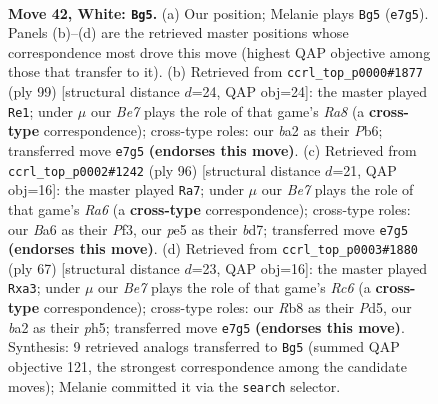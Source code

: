 \documentclass[11pt]{article}
\begin{document}
\clearpage

\begin{figure}[p]\centering
\begin{subfigure}{0.46\textwidth}\centering
\resizebox{\linewidth}{!}{%
\newchessgame
\chessboard[
  setfen={1R6/4B1k1/B7/4p3/4r2p/5p1P/b4P1K/8 w - - 12 42},
  showmover=false,
  pgfstyle=straightmove, color=movearrow, markmove={e7-g5}
]}
\caption{}
\end{subfigure}\hfill
\begin{subfigure}{0.46\textwidth}\centering
\resizebox{\linewidth}{!}{%
\newchessgame
\chessboard[
  setfen={8/8/1p6/p5pk/P3R3/4P2P/6K1/r7 b - - 3 50},
  showmover=false,
  pgfstyle=straightmove, color=movearrow, markmove={a1-e1}
]}
\caption{}
\end{subfigure}
\\[4pt]
\begin{subfigure}{0.46\textwidth}\centering
\resizebox{\linewidth}{!}{%
\newchessgame
\chessboard[
  setfen={8/3b2pk/R5p1/3r4/5p1P/2B2P2/6PK/8 w - - 19 49},
  showmover=false,
  pgfstyle=straightmove, color=movearrow, markmove={a6-a7}
]}
\caption{}
\end{subfigure}\hfill
\begin{subfigure}{0.46\textwidth}\centering
\resizebox{\linewidth}{!}{%
\newchessgame
\chessboard[
  setfen={8/6pk/4R3/3pP2P/p7/P1r5/5P1P/5K2 b - - 0 34},
  showmover=false,
  pgfstyle=straightmove, color=movearrow, markmove={c3-a3}
]}
\caption{}
\end{subfigure}
\caption{\textbf{Move 42, White: \texttt{Bg5}.} (a) Our position; Melanie plays \texttt{Bg5} (\texttt{e7g5}). Panels (b)--(d) are the retrieved master positions whose correspondence most drove this move (highest QAP objective among those that transfer to it). (b) Retrieved from \texttt{ccrl\_top\_p0000\#1877} (ply 99) [structural distance $d$=24, QAP obj=24]: the master played \texttt{Re1}; under $\mu$ our \emph{Be7} plays the role of that game's \emph{Ra8} (a \textbf{cross-type} correspondence); cross-type roles: our \emph{b}a2 as their \emph{P}b6; transferred move \texttt{e7g5} \textbf{(endorses this move)}. (c) Retrieved from \texttt{ccrl\_top\_p0002\#1242} (ply 96) [structural distance $d$=21, QAP obj=16]: the master played \texttt{Ra7}; under $\mu$ our \emph{Be7} plays the role of that game's \emph{Ra6} (a \textbf{cross-type} correspondence); cross-type roles: our \emph{B}a6 as their \emph{P}f3, our \emph{p}e5 as their \emph{b}d7; transferred move \texttt{e7g5} \textbf{(endorses this move)}. (d) Retrieved from \texttt{ccrl\_top\_p0003\#1880} (ply 67) [structural distance $d$=23, QAP obj=16]: the master played \texttt{Rxa3}; under $\mu$ our \emph{Be7} plays the role of that game's \emph{Rc6} (a \textbf{cross-type} correspondence); cross-type roles: our \emph{R}b8 as their \emph{P}d5, our \emph{b}a2 as their \emph{p}h5; transferred move \texttt{e7g5} \textbf{(endorses this move)}. Synthesis: 9 retrieved analogs transferred to \texttt{Bg5} (summed QAP objective 121, the strongest correspondence among the candidate moves); Melanie committed it via the \texttt{search} selector.}
\label{fig:thought-m82}
\end{figure}
\end{document}
